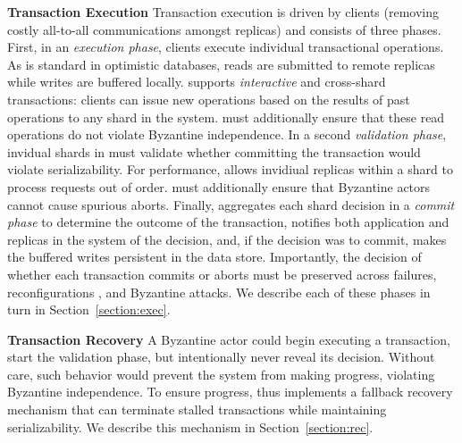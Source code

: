 \par \textbf{Transaction Execution} Transaction execution is driven by clients (removing costly all-to-all communications amongst replicas) and consists of three phases. First, in an \textit{execution phase}, clients execute individual transactional operations. As is standard in optimistic databases, reads are submitted to remote replicas while writes are buffered locally. \sys{} supports \textit{interactive} and cross-shard transactions: clients can issue new operations based on the results of past operations to any shard in the system. \sys{} must additionally ensure that these read operations do not violate Byzantine independence. In a second \textit{validation phase}, invidual shards in \sys{} must validate whether committing the transaction would violate serializability. For performance, \sys{} allows invidiual replicas within a shard to process requests out of order. \sys{} must additionally ensure that Byzantine actors cannot cause spurious aborts. Finally, \sys{} aggregates each shard decision in a \textit{commit phase}  to determine the outcome of the transaction, notifies both application and replicas in the system of the decision, and, if the decision was to commit, makes the buffered writes persistent in the data store.  Importantly, the decision of whether each transaction commits or aborts must be preserved across failures, reconfigurations , and Byzantine attacks. We describe each of these phases in turn in Section~\ref{section:exec}.

\par \textbf{Transaction Recovery} A Byzantine actor could begin executing a transaction, start the validation phase, but intentionally never reveal its decision. Without care,
such behavior would prevent the system from making progress, violating Byzantine independence. To ensure progress, \sys{} thus implements a fallback recovery mechanism that can terminate stalled transactions while maintaining  serializability. We describe this mechanism in Section~\ref{section:rec}.




